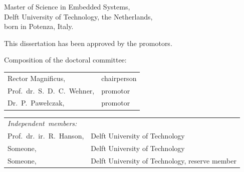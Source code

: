 \begin{titlepage}
\begin{center}
\bigskip
\bigskip

Master of Science in Embedded Systems, \\
Delft University of Technology, the Netherlands, \\
born in Potenza, Italy.

\vspace*{2\bigskipamount}

\end{center}

\clearpage
\thispagestyle{empty}

\noindent
This dissertation has been approved by the promotors.

\bigskip\noindent
Composition of the doctoral committee:

\medskip\noindent
\begin{tabular}{p{4.5cm}l}
    Rector Magnificus, & chairperson \\
    Prof.\ dr.\ S.\ D.\ C.\ Wehner, & promotor \\
    Dr.\ P.\ Pawełczak, & promotor \\
\end{tabular}

\medskip\noindent
\begin{tabular}{p{4.5cm}l}
    \mbox{\emph{Independent members:}} & \\
    Prof.\ dr.\ ir.\ R.\ Hanson, & Delft University of Technology \\
    Someone, & Delft University of Technology \\
    Someone, & Delft University of Technology, reserve member
\end{tabular}



\end{titlepage}
